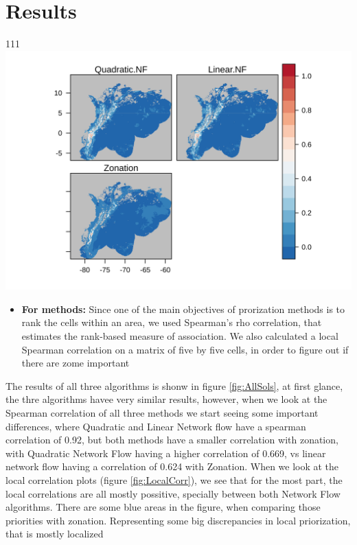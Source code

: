 \documentclass[]{article}
\providecommand{\tightlist}{%
  \setlength{\itemsep}{0pt}\setlength{\parskip}{0pt}}
\begin{document}
\hypertarget{results}{%
\section*{Results}\label{results}}

111\includegraphics{NFPaper_files/figure-latex/AllSols-1.png}

\begin{itemize}
\tightlist
\item
  \textbf{For methods:} Since one of the main objectives of prorization methods is to rank the cells within an area, we used Spearman's rho correlation, that estimates the rank-based measure of association. We also calculated a local Spearman correlation on a matrix of five by five cells, in order to figure out if there are zome important
\end{itemize}

The results of all three algorithms is shonw in figure \ref{fig:AllSols}, at first glance, the thre algorithms havee very similar results, however, when we look at the Spearman correlation of all three methods we start seeing some important differences, where Quadratic and Linear Network flow have a spearman correlation of 0.92, but both methods have a smaller correlation with zonation, with Quadratic Network Flow having a higher correlation of 0.669, vs linear network flow having a correlation of 0.624 with Zonation. When we look at the local correlation plots (figure \ref{fig:LocalCorr}), we see that for the most part, the local correlations are all mostly possitive, specially between both Network Flow algorithms. There are some blue areas in the figure, when comparing those priorities with zonation. Representing some big discrepancies in local priorization, that is mostly localized
\end{document}
